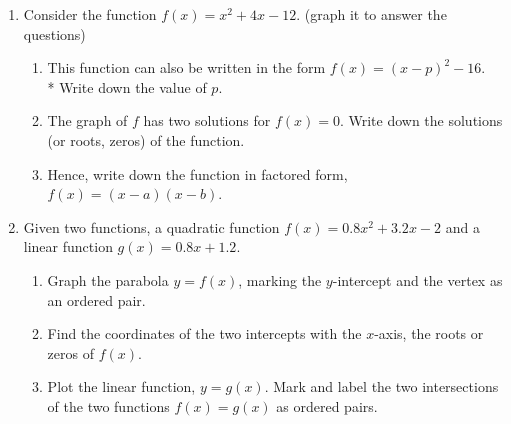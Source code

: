 \documentclass[12pt, twoside]{article}
\begin{document}
\begin{enumerate}
\item Consider the function $f(x)=x^2+4x-12$. (graph it to answer the questions)
\begin{enumerate}
    \item This function can also be written in the form $f(x)=(x-p)^2 -16$.\\* 
    Write down the value of $p$. \vspace{1.5cm}
    \item The graph of $f$ has two solutions for $f(x)=0$. Write down the solutions (or roots, zeros) of the function. \vspace{1.5cm}
    \item Hence, write down the function in factored form, $f(x)=(x-a)(x-b)$. \vspace{1.5cm}
\end{enumerate}
    
\newpage
\item Given two functions, a quadratic function $f(x)=0.8x^2+3.2x-2$ and a linear function $g(x)=0.8x+1.2$.
    \begin{enumerate}%
        \item Graph the parabola $y=f(x)$, marking the $y$-intercept and the vertex as an ordered pair.
        \item Find the coordinates of the two intercepts with the $x$-axis, the roots or zeros of $f(x)$.\vspace{1cm}
        \item Plot the linear function, $y=g(x)$. Mark and label the two intersections of the two functions $f(x)=g(x)$ as ordered pairs.
    \end{enumerate}
    \begin{center}
    \end{center}


\end{enumerate}
\end{document}
